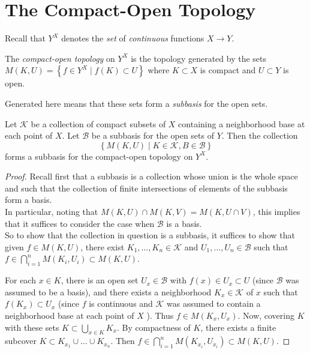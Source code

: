 \section{The Compact-Open Topology}

Recall that $Y^{X}$ denotes the \textit{set} of 
\textit{continuous} functions $X \to Y$.

\begin{definition}[]
    The \textit{compact-open topology} on $Y^{X}$ is the
    topology generated by the sets
    $M \left( K, U \right) 
    = \left\{ f \in Y^{X} \mid 
    f(K) \subset U \right\} $ where
    $K \subset X$ is compact and
    $U \subset Y$ is open.
\end{definition}
Generated here means that these sets form
a \textit{subbasis} for the open sets.\\


\begin{lemma}[]\label{Lemma:Compact-Open-Subbasis}
    Let $\mathcal{K}$ be a collection of compact subsets
    of $X$ containing a neighborhood base
    at each point of $X$. Let
    $\mathcal{B}$ be a subbasis for the open sets
    of $Y$. Then
    the collection
     \[
    \left\{ M\left( K,U \right)  \mid 
    K \in \mathcal{K}, B \in \mathcal{B} \right\} 
    \] 
    forms a subbasis for the compact-open topology
    on $Y^{X}$.
\end{lemma}

\begin{proof}
    Recall first that a subbasis is a collection whose
    union is the whole space and such that the
    collection of finite intersections of elements of the
    subbasis form a basis.\\
    In particular, noting that
    $M \left( K, U \right) \cap M\left( K,V \right) =
    M\left( K, U \cap V \right) $, this implies that it
    suffices to consider the case when $\mathcal{B}$ is
    a basis.\\
    So to show that the collection in question
    is a subbasis, it suffices to show that
    given $f \in M(K,U)$, there exist
    $K_1, \ldots,K_n \in \mathcal{K}$ and
    $U_1, \ldots, U_n \in \mathcal{B}$ such that
    $f \in \bigcap_{i=1}^{n} M\left( K_i,U_i \right) 
    \subset M\left( K,U \right) $.

    For each $x \in K$, there is an open
    set $U_x \in \mathcal{B}$ with
    $f(x) \in U_x \subset U$ (since $\mathcal{B}$ was
    assumed to be a basis), and there
    exists a neighborhood $K_x \in \mathcal{K}$  of
    $x$ such that $f(K_x) \subset U_x$ (since
    $f$ is continuous and $\mathcal{K}$ was assumed
    to contain a neighborhood base at each point of $X$ ).
    Thus $f \in M\left( K_x, U_x \right) $.
    Now, covering $K$ with these sets
    $K \subset \bigcup_{x \in K} K_{x}$. By 
    compactness of $K$, there exists a finite subcover
    $K \subset K_{x_1} \cup \ldots \cup K_{x_n}$. Then
    $f \in \bigcap_{i=1}^{n} M\left( K_{x_i}, U_{x_i} \right) 
    \subset M\left( K,U \right) $.
\end{proof}

